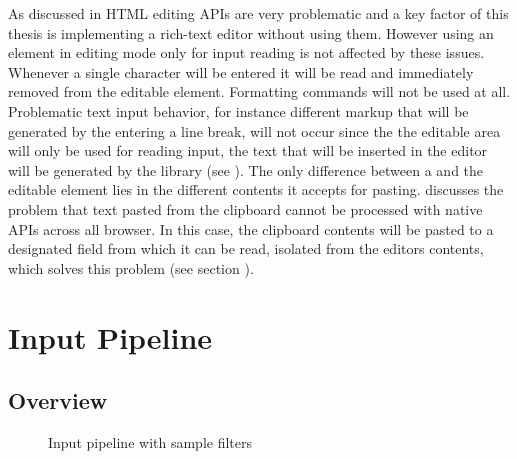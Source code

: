 As discussed in  HTML editing APIs are very problematic and a key factor of this thesis is implementing a rich-text editor without using them. However using an element in editing mode only for input reading is not affected by these issues. Whenever a single character will be entered it will be read and immediately removed from the editable element. Formatting commands will not be used at all. Problematic text input behavior, for instance different markup that will be generated by the entering a line break, will not occur since the the editable area will only be used for reading input, the text that will be inserted in the editor will be generated by the library (see ). The only difference between a  and the editable element lies in the different contents it accepts for pasting.  discusses the problem that text pasted from the clipboard cannot be processed with native APIs across all browser. In this case, the clipboard contents will be pasted to a designated field from which it can be read, isolated from the editors contents, which solves this problem (see section ).



\section{Input Pipeline}
\label{sec:input_pipeline}

\subsection{Overview} 
\label{subsec:input_pipeline_overview}

\begin{figure}[!htb]
\centering
{}
\caption{Input pipeline with sample filters}
\label{fig:type_base_components}
\end{figure}

